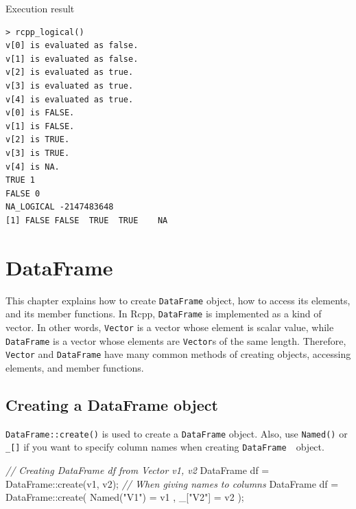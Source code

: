 \documentclass[]{book}
\newenvironment{Shaded}{\begin{snugshade}}{\end{snugshade}}
\newcommand{\SpecialCharTok}[1]{\textcolor[rgb]{0.00,0.00,0.00}{#1}}
\newcommand{\StringTok}[1]{\textcolor[rgb]{0.31,0.60,0.02}{#1}}
\newcommand{\CommentTok}[1]{\textcolor[rgb]{0.56,0.35,0.01}{\textit{#1}}}
\newcommand{\ControlFlowTok}[1]{\textcolor[rgb]{0.13,0.29,0.53}{\textbf{#1}}}
\newcommand{\NormalTok}[1]{#1}
\theoremstyle{definition}
\theoremstyle{definition}
\theoremstyle{remark}
\begin{document}
\begin{Shaded}
\begin{Highlighting}[]
{{{{{  \CommentTok{// Displays the value of TRUE, FALSE and NA_LOGICAL}
\NormalTok{  Rcout << }\StringTok{"TRUE "}\NormalTok{ << TRUE << }\StringTok{"}\SpecialCharTok{\textbackslash{}n}\StringTok{"}\NormalTok{;}
\NormalTok{  Rcout << }\StringTok{"FALSE "}\NormalTok{ << FALSE << }\StringTok{"}\SpecialCharTok{\textbackslash{}n}\StringTok{"}\NormalTok{;}
\NormalTok{  Rcout << }\StringTok{"NA_LOGICAL "}\NormalTok{ << NA_LOGICAL << }\StringTok{"}\SpecialCharTok{\textbackslash{}n}\StringTok{"}\NormalTok{;}

  \ControlFlowTok{return}\NormalTok{ v;}
\NormalTok{\}}
\end{Highlighting}
\end{Shaded}

Execution result

\begin{verbatim}
> rcpp_logical()
v[0] is evaluated as false.
v[1] is evaluated as false.
v[2] is evaluated as true.
v[3] is evaluated as true.
v[4] is evaluated as true.
v[0] is FALSE.
v[1] is FALSE.
v[2] is TRUE.
v[3] is TRUE.
v[4] is NA.
TRUE 1
FALSE 0
NA_LOGICAL -2147483648
[1] FALSE FALSE  TRUE  TRUE    NA
\end{verbatim}

\chapter{DataFrame}\label{dataframe}

This chapter explains how to create \texttt{DataFrame} object, how to
access its elements, and its member functions. In Rcpp,
\texttt{DataFrame} is implemented as a kind of vector. In other words,
\texttt{Vector} is a vector whose element is scalar value, while
\texttt{DataFrame} is a vector whose elements are \texttt{Vector}s of
the same length. Therefore, \texttt{Vector} and \texttt{DataFrame} have
many common methods of creating objects, accessing elements, and member
functions.

\section{Creating a DataFrame object}\label{creating-a-dataframe-object}

\texttt{DataFrame::create()} is used to create a \texttt{DataFrame}
object. Also, use \texttt{Named()} or \texttt{\_{[}{]}} if you want to
specify column names when creating \texttt{DataFrame}　object.

\begin{Shaded}
\begin{Highlighting}[]
\CommentTok{// Creating DataFrame df from Vector v1, v2}
\NormalTok{DataFrame df = DataFrame::create(v1, v2);}
\CommentTok{// When giving names to columns}
\NormalTok{DataFrame df = DataFrame::create( Named(}\StringTok{"V1"}\NormalTok{) = v1 , _[}\StringTok{"V2"}\NormalTok{] = v2 );}
\end{Highlighting}
\end{Shaded}
\end{document}
